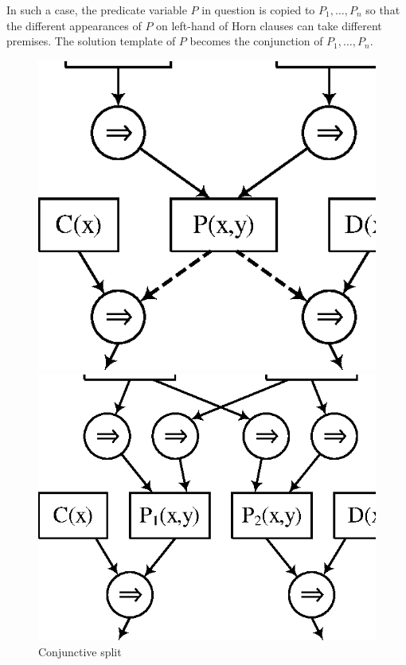In such a case, the predicate variable $P$ in question is copied to
$P_1, \ldots, P_n$ so that the different appearances of $P$ on
left-hand of Horn clauses can take different premises.  The solution
template of $P$ becomes the conjunction of $P_1, \ldots, P_n$.

\vspace{48pt}
\begin{figure}[htb]
  \begin{minipage}[t]{.47\textwidth}
  \centering
  \includegraphics[scale=0.8]{figures/conj1.eps}
  \end{minipage}
  \hfill
  \begin{minipage}[t]{.47\textwidth}
  \centering
  \includegraphics[scale=0.8]{figures/conj2.eps}
  \end{minipage}
  \caption{Conjunctive split}
  \label{fig:conj1}
\end{figure}

